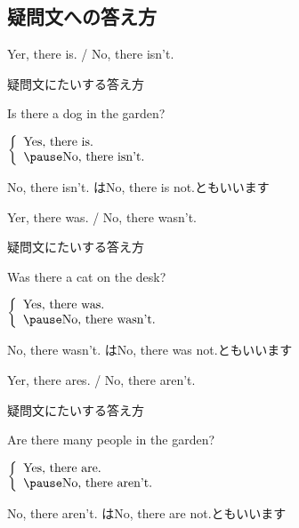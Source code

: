 \documentclass[aspectratio=169]{beamer}
\newcommand{\myaudio}[1]{\href{#1}{\faVolumeUp}}
\begin{document}
\subsection{疑問文への答え方}
 \begin{frame}[plain]{Yer, there is. / No, there isn't.}
 \Large

疑問文にたいする答え方\hfill\myaudio{./audio/001_there_is_09.mp3}
\vspace{10pt}

\pause

Is there a dog in the garden?

\pause

$\left\{\begin{array}{l}
	 \text{Yes, there is.}\\\pause
         \text{No, there isn't.}
	\end{array}\right.$

\pause

\mbox{}\hfill{}{\small No, there isn't. はNo, there is not.ともいいます}
\end{frame}
 \begin{frame}[plain]{Yer, there was. / No, there wasn't.}
 \Large

疑問文にたいする答え方\hfill\myaudio{./audio/001_there_is_10.mp3}
\vspace{10pt}

\pause
Was there a cat on the desk?

\pause

$\left\{\begin{array}{l}
	 \text{Yes, there was.}\\\pause
         \text{No, there wasn't.}
	\end{array}\right.$

\pause

\mbox{}\hfill{}{\small No, there wasn't. はNo, there was not.ともいいます}
\end{frame}
 \begin{frame}[plain]{Yer, there ares. / No, there aren't.}
 \Large

疑問文にたいする答え方\hfill\myaudio{./audio/001_there_is_11.mp3}
\vspace{10pt}

\pause

Are there many people in the garden?

\pause 

$\left\{\begin{array}{l}
	 \text{Yes, there are.}\\\pause
         \text{No, there aren't.}
	\end{array}\right.$

\pause

\mbox{}\hfill{}{\small No, there aren't. はNo, there are not.ともいいます}
\end{frame}
\end{document}

